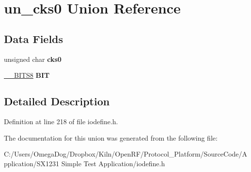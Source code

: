 \hypertarget{unionun__cks0}{\section{un\-\_\-cks0 Union Reference}
\label{unionun__cks0}
}
\subsection*{Data Fields}
\begin{DoxyCompactItemize}
\item 
\hypertarget{unionun__cks0_af8d94613adbd5640ce4593599667dd66}{unsigned char {\bfseries cks0}}\label{unionun__cks0_af8d94613adbd5640ce4593599667dd66}

\item 
\hypertarget{unionun__cks0_ab302c0597a8dcbb104df7444a0ada457}{\hyperlink{struct_____b_i_t_s8}{\-\_\-\-\_\-\-B\-I\-T\-S8} {\bfseries B\-I\-T}}\label{unionun__cks0_ab302c0597a8dcbb104df7444a0ada457}

\end{DoxyCompactItemize}


\subsection{Detailed Description}


Definition at line 218 of file iodefine.\-h.



The documentation for this union was generated from the following file\-:\begin{DoxyCompactItemize}
\item 
C\-:/\-Users/\-Omega\-Dog/\-Dropbox/\-Kiln/\-Open\-R\-F/\-Protocol\-\_\-\-Platform/\-Source\-Code/\-Application/\-S\-X1231 Simple Test Application/iodefine.\-h\end{DoxyCompactItemize}
